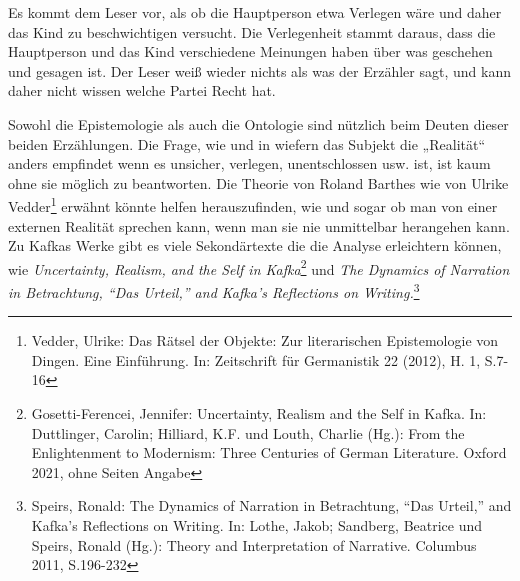 \documentclass[12pt,a4paper]{article}
\begin{document}
Es kommt dem Leser vor, als ob die Hauptperson etwa Verlegen wäre und daher das Kind zu beschwichtigen versucht. Die Verlegenheit stammt daraus, dass die Hauptperson und das Kind verschiedene Meinungen haben über was geschehen und gesagen ist. Der Leser weiß wieder nichts als was der Erzähler sagt, und kann daher nicht wissen welche Partei Recht hat.\par

Sowohl die Epistemologie als auch die Ontologie sind nützlich beim Deuten dieser beiden Erzählungen. Die Frage, wie und in wiefern das Subjekt die „Realität“ anders empfindet wenn es unsicher, verlegen, unentschlossen usw. ist, ist kaum ohne sie möglich zu beantworten. Die Theorie von Roland Barthes wie von Ulrike Vedder\footnote{Vedder, Ulrike: Das Rätsel der Objekte: Zur literarischen Epistemologie von Dingen. Eine Einführung. In: Zeitschrift für Germanistik 22 (2012), H. 1, S.7-16} erwähnt könnte helfen herauszufinden, wie und sogar ob man von einer externen Realität sprechen kann, wenn man sie nie unmittelbar herangehen kann. Zu Kafkas Werke gibt es viele Sekondärtexte die die Analyse erleichtern können, wie \textit{Uncertainty, Realism, and the Self in Kafka}\footnote{Gosetti-Ferencei, Jennifer: Uncertainty, Realism and the Self in Kafka. In: Duttlinger, Carolin; Hilliard, K.F. und Louth, Charlie (Hg.): From the Enlightenment to Modernism: Three Centuries of German Literature. Oxford 2021, ohne Seiten Angabe} und \textit{The Dynamics of Narration in Betrachtung, “Das Urteil,” and Kafka's Reflections on Writing.}\footnote{Speirs, Ronald: The Dynamics of Narration in Betrachtung, “Das Urteil,” and Kafka's Reflections on Writing. In: Lothe, Jakob; Sandberg, Beatrice und Speirs, Ronald (Hg.): Theory and Interpretation of Narrative. Columbus 2011, S.196-232}
\end{document}
